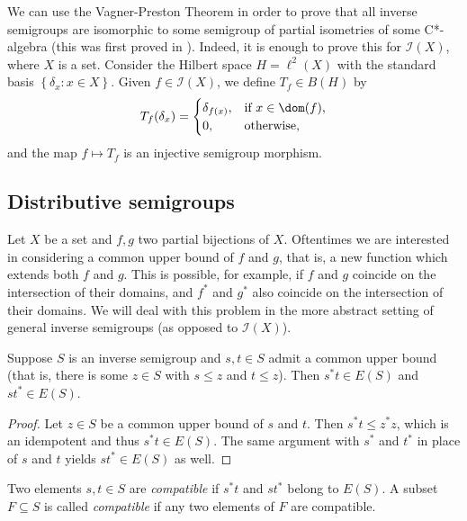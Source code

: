 We can use the Vagner-Preston Theorem in order to prove that all inverse semigroups are isomorphic to some semigroup of partial isometries of some C*-algebra (this was first proved in \cite{MR785726}). Indeed, it is enough to prove this for $\mathcal{I}(X)$, where $X$ is a set. Consider the Hilbert space $H=\ell^2(X)$ with the standard basis $\left\{\delta_x:x\in X\right\}$. Given $f\in\mathcal{I}(X)$, we define $T_f\in B(H)$ by
\[T_f(\delta_x)=\begin{cases}\delta_{f(x)},&\text{if }x\in\dom(f),\\
0,&\text{otherwise,}\end{cases}\]
and the map $f\mapsto T_f$ is an injective semigroup morphism.

\subsection{Distributive semigroups}

Let $X$ be a set and $f,g$ two partial bijections of $X$. Oftentimes we are interested in considering a common upper bound of $f$ and $g$, that is, a new function which extends both $f$ and $g$. This is possible, for example, if $f$ and $g$ coincide on the intersection of their domains, and $f^*$ and $g^*$ also coincide on the intersection of their domains. We will deal with this problem in the more abstract setting of general inverse semigroups (as opposed to $\mathcal{I}(X)$).

\begin{proposition}
Suppose $S$ is an inverse semigroup and $s,t\in S$ admit a common upper bound (that is, there is some $z\in S$ with $s\leq z$ and $t\leq z$). Then $s^*t\in E(S)$ and $st^*\in E(S)$.
\end{proposition}
\begin{proof}
Let $z\in S$ be a common upper bound of $s$ and $t$. Then $s^*t\leq z^*z$, which is an idempotent and thus $s^*t\in E(S)$. The same argument with $s^*$ and $t^*$ in place of $s$ and $t$ yields $st^*\in E(S)$ as well.\qedhere
\end{proof}

\begin{definition}\label{definitioncompatibility}
Two elements $s,t\in S$ are \emph{compatible} if $s^*t$ and $st^*$ belong to $E(S)$. A subset $F\subseteq S$ is called \emph{compatible} if any two elements of $F$ are compatible.
\end{definition}

